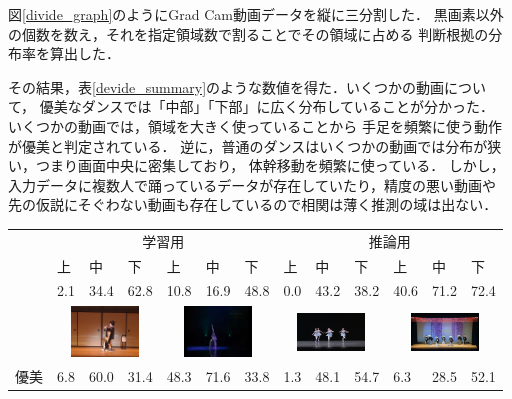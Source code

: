図\ref{divide_graph}のようにGrad Cam動画データを縦に三分割した．
黒画素以外の個数を数え，それを指定領域数で割ることでその領域に占める
判断根拠の分布率を算出した．

その結果，表\ref{devide_summary}のような数値を得た．いくつかの動画について，
優美なダンスでは「中部」「下部」に広く分布していることが分かった．
いくつかの動画では，領域を大きく使っていることから
手足を頻繁に使う動作が優美と判定されている．
逆に，普通のダンスはいくつかの動画では分布が狭い，つまり画面中央に密集しており，
体幹移動を頻繁に使っている．
しかし，入力データに複数人で踊っているデータが存在していたり，精度の悪い動画や
先の仮説にそぐわない動画も存在しているので相関は薄く推測の域は出ない．

\begin{table}[t]
  \begin{center}
    \begin{tabular}{|c|p{5mm}p{5mm}p{5mm}|p{5mm}p{5mm}p{5mm}|p{5mm}p{5mm}p{5mm}|p{5mm}p{5mm}p{5mm}|} \hline
        & \multicolumn{6}{|c|}{学習用} & \multicolumn{6}{|c|}{推論用} \\ \cline{2-13}
        &上 &中 &下 &上 &中 &下 &上 &中 &下 &上 &中 &下 \\ \hline
        &2.1 &34.4 &62.8 &10.8 &16.9 &48.8 &0.0 &43.2 &38.2 &40.6 &71.2 &72.4 \\
        & \multicolumn{3}{|c|}{\includegraphics[width=18mm]{images/snaps/japanese_elegant.png}}
        & \multicolumn{3}{|c|}{\includegraphics[width=18mm]{images/snaps/chinese_elegant.png}}
        & \multicolumn{3}{|c|}{\includegraphics[width=18mm]{images/snaps/ballet_group_elegant.png}}
        & \multicolumn{3}{|c|}{\includegraphics[width=18mm]{images/snaps/japanese_group_elegant.png}}
      \\ \cline{2-13}
      優美
        &6.8 &60.0 &31.4 &48.3 &71.6 &33.8 &1.3 &48.1 &54.7 &6.3 &28.5 &52.1 \\

\end{tabular}
\end{center}
\end{table}
